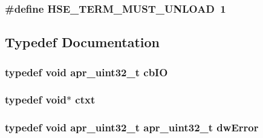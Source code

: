\subsubsection[{\texorpdfstring{H\+S\+E\+\_\+\+T\+E\+R\+M\+\_\+\+M\+U\+S\+T\+\_\+\+U\+N\+L\+O\+AD}{HSE_TERM_MUST_UNLOAD}}]{\setlength{\rightskip}{0pt plus 5cm}\#define H\+S\+E\+\_\+\+T\+E\+R\+M\+\_\+\+M\+U\+S\+T\+\_\+\+U\+N\+L\+O\+AD~1}\hypertarget{group__MOD__ISAPI_ga604c192e9da2895d50321e96b45df1f3}{}\label{group__MOD__ISAPI_ga604c192e9da2895d50321e96b45df1f3}


\subsection{Typedef Documentation}
\subsubsection[{\texorpdfstring{cb\+IO}{cbIO}}]{\setlength{\rightskip}{0pt plus 5cm}typedef {\bf void} {\bf apr\+\_\+uint32\+\_\+t} {\bf cb\+IO}}\hypertarget{group__MOD__ISAPI_gabbf0f8e6a7e82fb7b169e46a7317c3bb}{}\label{group__MOD__ISAPI_gabbf0f8e6a7e82fb7b169e46a7317c3bb}
\subsubsection[{\texorpdfstring{ctxt}{ctxt}}]{\setlength{\rightskip}{0pt plus 5cm}typedef {\bf void}$\ast$ {\bf ctxt}}\hypertarget{group__MOD__ISAPI_ga79fe6db219ce5e6dc5f02c36ee429ae6}{}\label{group__MOD__ISAPI_ga79fe6db219ce5e6dc5f02c36ee429ae6}
\subsubsection[{\texorpdfstring{dw\+Error}{dwError}}]{\setlength{\rightskip}{0pt plus 5cm}typedef {\bf void} {\bf apr\+\_\+uint32\+\_\+t} {\bf apr\+\_\+uint32\+\_\+t} {\bf dw\+Error}}\hypertarget{group__MOD__ISAPI_gaf9e0aad3965e7e5ebdcc8b4535ce45cf}{}\label{group__MOD__ISAPI_gaf9e0aad3965e7e5ebdcc8b4535ce45cf}
